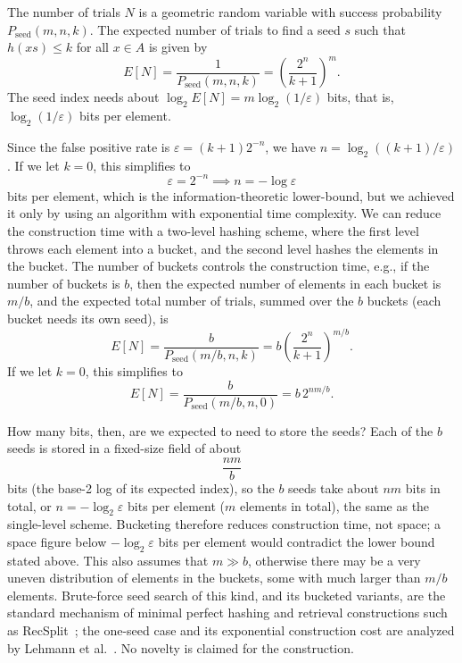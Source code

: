 \documentclass[../main.tex]{subfiles}
\begin{document}
The number of trials $N$ is a geometric random variable with success probability $P_{\mathrm{seed}}(m,n,k)$. The expected number of trials to find a seed $s$ such that $h(x s) \leq k$ for all $x \in A$ is given by
\begin{equation}
    E[N] = \frac{1}{P_{\mathrm{seed}}(m,n,k)} = \left(\frac{2^n}{k+1}\right)^m.
\end{equation}
The seed index needs about $\log_2 E[N] = m \log_2(1/\varepsilon)$ bits, that is, $\log_2(1/\varepsilon)$ bits per element.

Since the false positive rate is $\varepsilon = (k+1) 2^{-n}$, we have $n = \log_2((k+1)/\varepsilon)$.
If we let $k=0$, this simplifies to
$$
\varepsilon = 2^{-n} \implies n = -\log \varepsilon
$$
bits per element, which is the information-theoretic lower-bound, but we achieved it only by using an algorithm
with exponential time complexity.
We can reduce the construction time with a two-level hashing
scheme, where the first level throws each element into a bucket, and the second level hashes
the elements in the bucket. The number of buckets controls the construction time,
e.g., if the number of buckets is $b$, then the expected number of elements in each bucket is $m/b$,
and the expected total number of trials, summed over the $b$ buckets (each bucket needs its own seed), is
\begin{equation}
    E[N] = \frac{b}{P_{\mathrm{seed}}(m/b,n,k)} = b \left(\frac{2^n}{k+1}\right)^{m/b}.
\end{equation}
If we let $k=0$, this simplifies to
$$
    E[N] = \frac{b}{P_{\mathrm{seed}}(m/b,n,0)} = b \, 2^{n m / b}.
$$

How many bits, then, are we expected to need to store the seeds? Each of the $b$ seeds is stored in a fixed-size field of about
$$
    \frac{n m}{b}
$$
bits (the base-2 log of its expected index), so the $b$ seeds take about $n m$ bits in total, or $n = -\log_2 \varepsilon$ bits per element ($m$ elements in total), the same as the single-level scheme.
Bucketing therefore reduces construction time, not space; a space figure below $-\log_2 \varepsilon$ bits per element would contradict the lower bound stated above.
This also assumes that $m \gg b$, otherwise there may be a very uneven distribution of elements in the buckets, some with much larger than $m/b$ elements.
Brute-force seed search of this kind, and its bucketed variants, are the standard mechanism of minimal perfect hashing and retrieval constructions such as RecSplit~\cite{esposito2020recsplit}; the one-seed case and its exponential construction cost are analyzed by Lehmann et al.~\cite{lehmann2025seeds}. No novelty is claimed for the construction.
\end{document}
